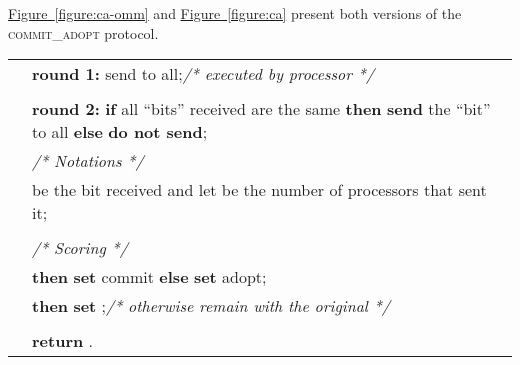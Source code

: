 \documentclass[11pt]{article}
\newcommand{\namedref}[2]{\hyperref[#2]{#1~\ref*{#2}}}
\newcommand{\figureref}[1]{\namedref{Figure}{#1}}
\newcommand{\tb}{\makebox[0.6cm]{}}
\newcommand{\due}{\makebox[1cm]{}}
\newcommand{\ca}{{\small\textsc{commit\!\_adopt}}\xspace}
\begin{document}
\figureref{figure:ca-omm} and \figureref{figure:ca} present both versions of the \ca protocol. 


\begin{algorithm}[!ht]
\footnotesize
{}
 \setcounter{AlgoLine}{0}
\begin{tabular}{ r l }
\lnl{line:o-vote1} &  {\bf round 1:}   send  to all;\hspace{2.2in}\hfill\textit{/* executed by processor  */}\\
\\
\lnl{line:o-test}&  {\bf round 2:}  {\bf if}  all ``bits'' received are the same  {\bf then} {\bf send} the ``bit'' to all  {\bf else} {\bf do not send};\\
\nl & \tb\due \textit{/* Notations */}\\
\nl & \tb\due {\bf let}  be the bit received and let  be the number of processors that sent it;\\
\\
\nl &  \textit{/* Scoring */}\\
\lnl{line:o-commit}& \tb {\bf if}   {\bf then} {\bf set}  {\sc commit}  {\bf else} {\bf set}  {\sc adopt};\\
\lnl{line:o-value}& \tb {\bf if}  {\bf then} {\bf set}  ;\hfill\textit{/* otherwise remain with the original  */}\\
\\
\nl & {\bf return} .
\end{tabular}
\caption{ \ca\!: The Commit Adopt protocol for omission faults}\label{figure:ca-omm}
\end{algorithm}
\end{document}

